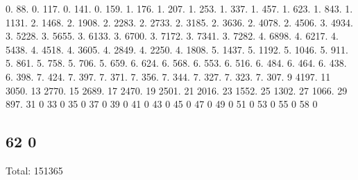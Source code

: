 0. 88. 0. 117. 0. 141. 0. 159. 1. 176. 1. 207. 1. 253. 1. 337. 1. 457. 1. 623. 1. 843. 1. 1131. 2. 1468. 2. 1908. 2. 2283. 2. 2733. 2. 3185. 2. 3636. 2. 4078. 2. 4506. 3. 4934. 3. 5228. 3. 5655. 3. 6133. 3. 6700. 3. 7172. 3. 7341. 3. 7282. 4. 6898. 4. 6217. 4. 5438. 4. 4518. 4. 3605. 4. 2849. 4. 2250. 4. 1808. 5. 1437. 5. 1192. 5. 1046. 5. 911. 5. 861. 5. 758. 5. 706. 5. 659. 6. 624. 6. 568. 6. 553. 6. 516. 6. 484. 6. 464. 6. 438. 6. 398. 7. 424. 7. 397. 7. 371. 7. 356. 7. 344. 7. 327. 7. 323. 7. 307. 9 4197. 11 3050. 13 2770. 15 2689. 17 2470. 19 2501. 21 2016. 23 1552. 25 1302. 27 1066. 29 897. 31 0 33 0 35 0 37 0 39 0 41 0 43 0 45 0 47 0 49 0 51 0 53 0 55 0 58 0 \subsection*{62 0 }

Total\+: 151365 
